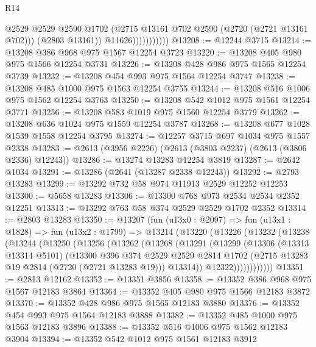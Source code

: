 \begin{lexlean}{R14}
\begin{coremodule}
                            @2529
                            @2529
                            @2590
                            @1702
                            (@2715 @13161 @702 @2590 (@2720 (@2721 @13161 @702)))
                            (@2803 @13161))
                          @11626)))))))))))
@13208 := @12244 @3715
@13214 := @13208 @386 @968 @975 @1567 @12254 @3723
@13220 := @13208 @405 @980 @975 @1566 @12254 @3731
@13226 := @13208 @428 @986 @975 @1565 @12254 @3739
@13232 := @13208 @454 @993 @975 @1564 @12254 @3747
@13238 := @13208 @485 @1000 @975 @1563 @12254 @3755
@13244 := @13208 @516 @1006 @975 @1562 @12254 @3763
@13250 := @13208 @542 @1012 @975 @1561 @12254 @3771
@13256 := @13208 @583 @1019 @975 @1560 @12254 @3779
@13262 := @13208 @636 @1024 @975 @1559 @12254 @3787
@13268 := @13208 @677 @1028 @1539 @1558 @12254 @3795
@13274 := @12257 @3715 @697 @1034 @975 @1557 @2338
@13283 := @2613 (@3956 @2226) (@2613 (@3803 @2237) (@2613 (@3806 @2336) @12243))
@13286 := @13274 @13283 @12254 @3819
@13287 := @2642 @1034
@13291 := @13286 (@2641 (@13287 @2338 @12243))
@13292 := @2793 @13283
@13299 := @13292 @732 @58 @974 @11913 @2529 @12252 @12253
@13300 := @5658 @13283
@13306 := @13300 @768 @973 @2534 @2534 @2352 @12251
@13313 := @13292 @763 @58 @374 @2529 @2529 @1702 @2352
@13314 := @2803 @13283
@13350 := @13207
    (fun (u13x0 : @2097) =>
    fun (u13x1 : @1828) =>
    fun (u13x2 : @1799) =>
    @13214
      (@13220
        (@13226
          (@13232
            (@13238
              (@13244
                (@13250
                  (@13256
                    (@13262
                      (@13268
                        (@13291
                          (@13299
                            (@13306
                              (@13313 @13314 @5101)
                              (@13300
                                @396
                                @374
                                @2529
                                @2529
                                @2814
                                @1702
                                (@2715 @13283 @19 @2814 (@2720 (@2721 @13283 @19)))
                                @13314))
                            @12322))))))))))))
@13351 := @2813 @12162
@13352 := @13351 @3856
@13358 := @13352 @386 @968 @975 @1567 @12183 @3864
@13364 := @13352 @405 @980 @975 @1566 @12183 @3872
@13370 := @13352 @428 @986 @975 @1565 @12183 @3880
@13376 := @13352 @454 @993 @975 @1564 @12183 @3888
@13382 := @13352 @485 @1000 @975 @1563 @12183 @3896
@13388 := @13352 @516 @1006 @975 @1562 @12183 @3904
@13394 := @13352 @542 @1012 @975 @1561 @12183 @3912

\end{coremodule}
\end{lexlean}
